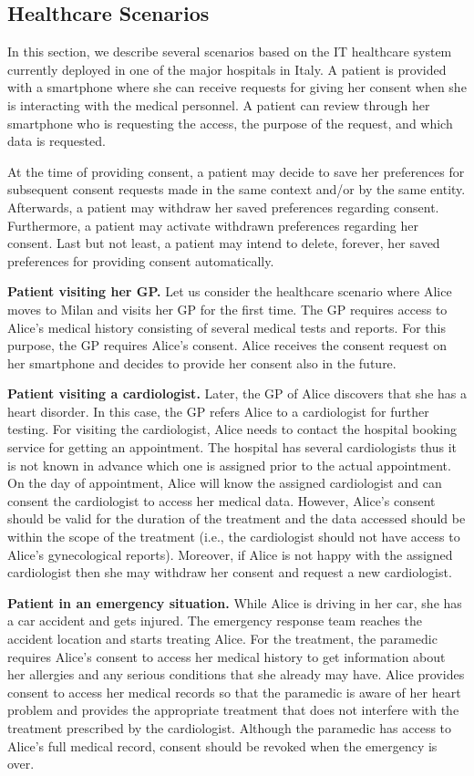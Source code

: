 \documentclass[10pt, conference, compsocconf]{IEEEtran}
\begin{document}
\subsection{Healthcare Scenarios}

In this section, we describe several scenarios based on the IT healthcare system currently deployed in one of the major hospitals in Italy. A patient is provided with a smartphone where she can receive requests for giving her consent when she is interacting with the medical personnel. A patient can review through her smartphone who is requesting the access, the purpose of the request, and which data is requested.

At the time of providing consent, a patient may decide to save her preferences for subsequent consent requests made in the same context and/or by the same entity. Afterwards, a patient may withdraw her saved preferences regarding consent. Furthermore, a patient may activate withdrawn preferences regarding her consent. Last but not least, a patient may intend to delete, forever, her saved preferences for providing consent automatically.


\textbf{Patient visiting her GP.}
Let us consider the healthcare scenario where Alice moves to Milan and visits her GP for the first time. The GP requires access to Alice's medical history consisting of several medical tests and reports. For this purpose, the GP requires Alice's consent. Alice receives the consent request on her smartphone and decides to provide her consent also in the future.

\textbf{Patient visiting a cardiologist.}
Later, the GP of Alice discovers that she has a heart disorder. In this case, the GP refers Alice to a cardiologist for further testing. For visiting the cardiologist, Alice needs to contact the hospital booking service for getting an appointment. The hospital has several cardiologists thus it is not known in advance which one is assigned prior to the actual appointment. On the day of appointment, Alice will know the assigned cardiologist and can consent the cardiologist to access her medical data. However, Alice's consent should be valid for the duration of the treatment and the data accessed should be within the scope of the treatment (i.e., the cardiologist should not have access to Alice's gynecological reports). Moreover, if Alice is not happy with the assigned cardiologist then she may withdraw her consent and request a new cardiologist.

\textbf{Patient in an emergency situation.}
While Alice is driving in her car, she has a car accident and gets injured. The emergency response team reaches the accident location and starts treating Alice. For the treatment, the paramedic requires Alice's consent to access her medical history to get information about her allergies and any serious conditions that she already may have. Alice provides consent to access her medical records so that the paramedic is aware of her heart problem and provides the appropriate treatment that does not interfere with the treatment prescribed by the cardiologist. Although the paramedic has access to Alice's full medical record, consent should be revoked when the emergency is over.
\end{document}
